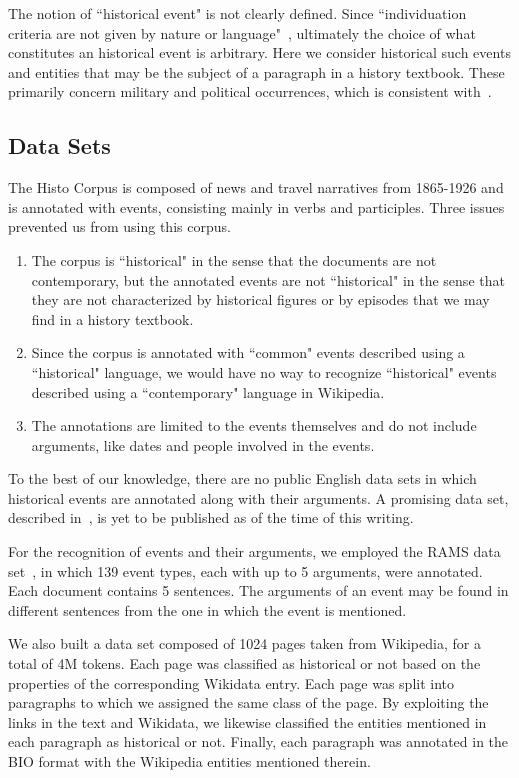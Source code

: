 \documentclass[runningheads]{llncs}
\begin{document}
The notion of “historical event" is not clearly defined. Since “individuation criteria are not given by nature or language"~\cite{shaw-2010-phdthesis}, ultimately the choice of what constitutes an historical event is arbitrary. Here we consider historical such events and entities that may be the subject of a paragraph in a history textbook. These primarily concern military and political occurrences, which is consistent with~\cite{cybulska-vossen-2011-historical}.

\subsection{Data Sets}

The Histo Corpus is composed of news and travel narratives from 1865-1926 and is annotated with events, consisting mainly in verbs and participles. Three issues prevented us from using this corpus. 

\begin{enumerate}
    \item The corpus is “historical" in the sense that the documents are not contemporary, but the annotated events are not “historical" in the sense that they are not characterized by historical figures or by episodes that we may find in a history textbook. 
    \item Since the corpus is annotated with “common" events described using a “historical" language, we would have no way to recognize “historical" events described using a “contemporary" language in Wikipedia.
    \item The annotations are limited to the events themselves and do not include arguments, like dates and people involved in the events.
\end{enumerate}

To the best of our knowledge, there are no public English data sets in which historical events are annotated along with their arguments. A promising data set, described in~\cite{lai-etal-2021-event}, is yet to be published as of the time of this writing.

For the recognition of events and their arguments, we employed the RAMS data set~\cite{ebner-etal-2020-rams}, in which 139 event types, each with up to 5 arguments, were annotated. Each document contains 5 sentences. The arguments of an event may be found in different sentences from the one in which the event is mentioned.

We also built a data set composed of 1024 pages taken from Wikipedia, for a total of 4M tokens. Each page was classified as historical or not based on the properties of the corresponding Wikidata entry. Each page was split into paragraphs to which we assigned the same class of the page. By exploiting the links in the text and Wikidata, we likewise classified the entities mentioned in each paragraph as historical or not. Finally, each paragraph was annotated in the BIO format with the Wikipedia entities mentioned therein.
\end{document}
